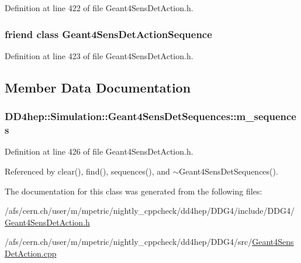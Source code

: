 Definition at line 422 of file Geant4SensDetAction.h.\hypertarget{class_d_d4hep_1_1_simulation_1_1_geant4_sens_det_sequences_a0dd78d992a2c8dccba1ab80d814020cc}{
\subsubsection[{Geant4SensDetActionSequence}]{\setlength{\rightskip}{0pt plus 5cm}friend class {\bf Geant4SensDetActionSequence}}}
\label{class_d_d4hep_1_1_simulation_1_1_geant4_sens_det_sequences_a0dd78d992a2c8dccba1ab80d814020cc}


Definition at line 423 of file Geant4SensDetAction.h.

\subsection{Member Data Documentation}
\hypertarget{class_d_d4hep_1_1_simulation_1_1_geant4_sens_det_sequences_a913b05e77e69effeeafbd0f7a604cd70}{
\subsubsection[{m\_\-sequences}]{ {\bf DD4hep::Simulation::Geant4SensDetSequences::m\_\-sequences}}}
\label{class_d_d4hep_1_1_simulation_1_1_geant4_sens_det_sequences_a913b05e77e69effeeafbd0f7a604cd70}


Definition at line 426 of file Geant4SensDetAction.h.

Referenced by clear(), find(), sequences(), and $\sim$Geant4SensDetSequences().

The documentation for this class was generated from the following files:\begin{DoxyCompactItemize}
\item 
/afs/cern.ch/user/m/mpetric/nightly\_\-cppcheck/dd4hep/DDG4/include/DDG4/\hyperlink{_geant4_sens_det_action_8h}{Geant4SensDetAction.h}\item 
/afs/cern.ch/user/m/mpetric/nightly\_\-cppcheck/dd4hep/DDG4/src/\hyperlink{_geant4_sens_det_action_8cpp}{Geant4SensDetAction.cpp}\end{DoxyCompactItemize}
